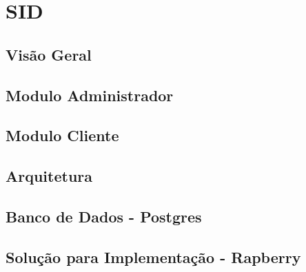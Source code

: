 \chapter[SID]{SID}
\section{Visão Geral}
\section{Modulo Administrador}
\section{Modulo Cliente}
\section{Arquitetura}
\section{Banco de Dados - Postgres}
\section{Solução para Implementação - Rapberry}